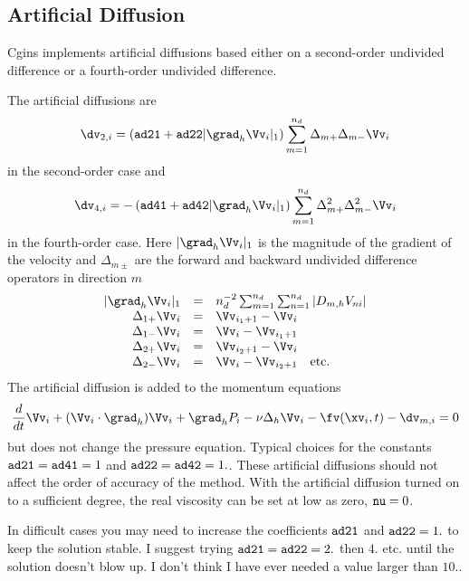 \subsection{Artificial Diffusion} \label{AD}

Cgins implements 
artificial diffusions based either on a second-order undivided
difference or a fourth-order undivided difference.

The artificial diffusions are
\begin{equation} \label{AD2}
   \dv_{2,i} =
    \left( {\ff ad21} + {\ff ad22} | \grad_h \Vv_i |_1
    \right) \sum_{m=1}^{n_d} \Delta_{m+}\Delta_{m-} \Vv_i
\end{equation}
in the second-order case and
\begin{equation} \label{AD4}
   \dv_{4,i} =
  - \left( {\ff ad41} + {\ff ad42} | \grad_h \Vv_i |_1
    \right) \sum_{m=1}^{n_d} \Delta_{m+}^2\Delta_{m-}^2 \Vv_i
\end{equation}
in the fourth-order case. Here $|\grad_h \Vv_i |_1$ is the magnitude of the
gradient of the velocity and $\Delta_{m\pm}$ are the forward and backward
undivided difference operators in direction $m$
$$
\begin{array}{rcl}
  | \grad_h \Vv_i |_1 &=& n_d^{-2}
          \sum_{m=1}^{n_d} \sum_{n=1}^{n_d} | D_{m,h} V_{n i} | \\
  \Delta_{1+}\Vv_i &=& \Vv_{i_1+1} - \Vv_i \\
  \Delta_{1-}\Vv_i &=& \Vv_i - \Vv_{i_1+1}   \\
  \Delta_{2+}\Vv_i &=& \Vv_{i_2+1} - \Vv_i \\
  \Delta_{2-}\Vv_i &=& \Vv_i - \Vv_{i_2+1}  ~~~\mbox{etc.} \\
\end{array}
$$
The artificial diffusion is added to the momentum equations
$$
  {d\over dt} \Vv_i + (\Vv_i\cdot\grad_h)\Vv_i + \grad_h \pd_i
       - \nu \Delta_h \Vv_i -\fv(\xv_i,t) - \dv_{m,i}  = 0
$$
but does not change the pressure equation.
Typical choices for the constants  ${\tt ad21}={\tt ad41}=1$
and ${\tt ad22}={\tt ad42}=1.$. These artificial diffusions
should not affect the order of accuracy of the method.
With the artificial diffusion turned on to a sufficient degree, the
real viscosity can be set at low as zero, ${\tt nu}=0$.

In difficult cases you may need to increase the coefficients 
${\tt ad21}$ and ${\tt ad22}=1.$ to keep the solution stable. 
I suggest trying ${\tt ad21}={\tt ad22}=2.$ then $4.$ etc. until
the solution doesn't blow up. I don't think I have ever needed
a value larger than $10.$. 

